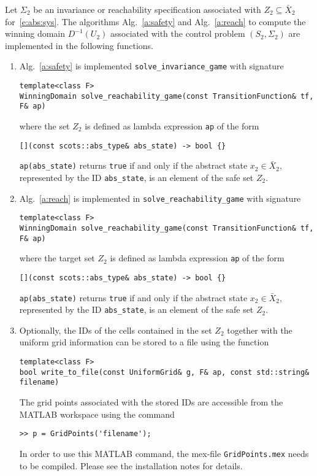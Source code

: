 \documentclass[a4paper]{amsart}
\begin{document}
Let $\Sigma_2$ be an invariance or reachability specification associated with $Z_2\subseteq \bar
X_2$ for~\eqref{e:abs:sys}.
The algorithms Alg.~\ref{a:safety} and Alg.~\ref{a:reach} to compute the winning
domain $D^{-1}(U_2)$ associated with the control problem $(S_2,\Sigma_2)$
are implemented in the following functions.
\begin{enumerate}
  \item Alg.~\ref{a:safety} is implemented {\tt solve\_invariance\_game} with signature 
\begin{lstlisting}[basicstyle=\small\ttfamily]
template<class F> 
WinningDomain solve_reachability_game(const TransitionFunction& tf, F& ap)
\end{lstlisting}
  where the set $Z_2$ is defined as lambda expression {\tt ap} of the form
\begin{lstlisting}[basicstyle=\small\ttfamily]
[](const scots::abs_type& abs_state) -> bool {}
\end{lstlisting}
  {\tt ap(abs\_state)} returns {\tt true} if and only if the abstract state $x_2\in\bar X_2$, represented by
  the ID {\tt abs\_state}, is  an element of the safe set $Z_2$.

  \item Alg.~\ref{a:reach} is implemented in {\tt solve\_reachability\_game} with signature 
\begin{lstlisting}[basicstyle=\small\ttfamily]
template<class F>
WinningDomain solve_reachability_game(const TransitionFunction& tf, F& ap)
\end{lstlisting}
  where the target set $Z_2$ is defined as lambda expression {\tt ap} of the
  form
\begin{lstlisting}[basicstyle=\small\ttfamily]
[](const scots::abs_type& abs_state) -> bool {}
\end{lstlisting}
  {\tt ap(abs\_state)} returns {\tt true} if and only if the abstract state $x_2\in\bar X_2$, represented by
  the ID {\tt abs\_state}, is  an element of the safe set $Z_2$.

  \item Optionally, the IDs of the cells contained in the set $Z_2$ together
  with the uniform grid information can be stored to a file using the function
\begin{lstlisting}[basicstyle=\small\ttfamily]
template<class F>
bool write_to_file(const UniformGrid& g, F& ap, const std::string& filename)
\end{lstlisting}
The grid points associated with the stored IDs are accessible from the MATLAB
workspace using the command
\begin{lstlisting}[basicstyle=\small\ttfamily]
>> p = GridPoints('filename');
\end{lstlisting}
In order to use this MATLAB command, the mex-file {\tt GridPoints.mex} needs to
be compiled. Please see the installation notes for details.

\end{enumerate}
\end{document}
